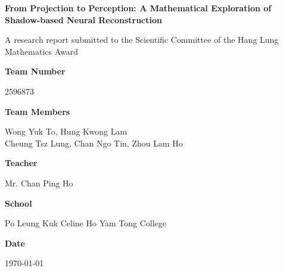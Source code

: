 \documentclass[12pt]{article}
\newcommand{\R}{\mathbb{R}}
\theoremstyle{definition}
\begin{document}
\begin{titlepage}
    \centering
    \vspace*{1cm}
    {\huge \textbf{From Projection to Perception: A Mathematical Exploration of Shadow-based Neural Reconstruction}\par}
    \vspace{1.5cm}
    {\normalsize
    A research report submitted to the Scientific Committee of the Hang Lung Mathematics Award\par}
    \vspace{1cm}
    {\normalsize \textbf{Team Number}\par 2596873\par}
    \vspace{0.5cm}
    {\normalsize \textbf{Team Members}\par Wong Yuk To, Hung Kwong Lam \\ Cheung Tsz Lung, Chan Ngo Tin, Zhou Lam Ho\par}
    \vspace{0.5cm}
    {\normalsize \textbf{Teacher}\par Mr. Chan Ping Ho\par}
    \vspace{0.5cm}
    {\normalsize \textbf{School}\par Po Leung Kuk Celine Ho Yam Tong College\par}
    \vspace{0.5cm}
    {\normalsize \textbf{Date}\par \today\par}
    \vspace{2cm}

\begin{abstract}
\raggedright
This paper explores \textsc{ShadowNeuS} [LWX23], a neural network that reconstructs 3D geometry from single-view camera images using shadow and light cues. Unlike traditional 3D reconstruction methods relying on multi-view cameras or sensors, \textsc{ShadowNeuS} leverages a neural signed distance field (SDF) for accurate 3D geometry reconstruction. We analyze the training process and uncover its connections to projective geometry, spatial reasoning in $\R^3$, and the neural network's learned geometric representation of space.
\end{abstract}

\end{titlepage}

\tableofcontents
\end{document}
